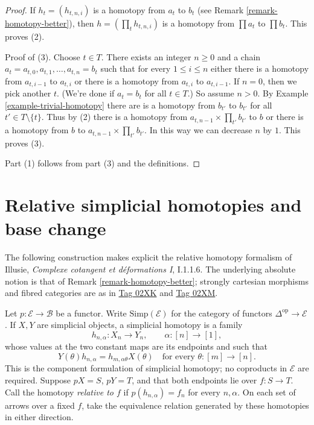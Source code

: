 \begin{proof}
If $h_t = (h_{t, n , i})$ is a homotopy from $a_t$ to $b_t$
(see Remark \ref{remark-homotopy-better}), then
$h = (\prod_t h_{t, n, i})$ is a homotopy from $\prod a_t$ to $\prod b_t$.
This proves (2).

\medskip\noindent
Proof of (3). Choose $t \in T$. There exists an integer $n \geq 0$
and a chain $a_t = a_{t, 0}, a_{t, 1}, \ldots, a_{t, n} = b_t$ such that
for every $1 \leq i \leq n$ either there is a homotopy from
$a_{t, i - 1}$ to $a_{t, i}$ or there is a homotopy from
$a_{t, i}$ to $a_{t, i - 1}$. If $n = 0$, then we pick another $t$.
(We're done if $a_t = b_t$ for all $t \in T$.) So assume $n > 0$.
By Example \ref{example-trivial-homotopy}
there are is a homotopy from $b_{t'}$ to $b_{t'}$ for all
$t' \in T \setminus \{t\}$. Thus by (2) there is a homotopy from
$a_{t, n - 1} \times \prod_{t'} b_{t'}$ to $b$ or there is a
homotopy from $b$ to $a_{t, n - 1} \times \prod_{t'} b_{t'}$.
In this way we can decrease $n$ by $1$. This proves (3).

\medskip\noindent
Part (1) follows from part (3) and the definitions.
\end{proof}





\section{Relative simplicial homotopies and base change}
\label{section-illusie-I-relative-homotopy}

\noindent
The following construction makes explicit the relative homotopy formalism
of Illusie, \textit{Complexe cotangent et d\'eformations I}, I.1.1.6.
The underlying absolute notion is that of
Remark \ref{remark-homotopy-better}; strongly cartesian morphisms and fibred
categories are as in
\href{https://stacks.math.columbia.edu/tag/02XK}{Tag 02XK} and
\href{https://stacks.math.columbia.edu/tag/02XM}{Tag 02XM}.

Let $p:\mathcal E\to\mathcal B$ be a functor. Write
$\mathrm{Simp}(\mathcal E)$ for the category of functors
$\Delta^{\mathrm{op}}\to\mathcal E$. If $X,Y$ are simplicial objects,
a simplicial homotopy is a family
$$
h_{n,\alpha}:X_n\longrightarrow Y_n,
\qquad \alpha:[n]\longrightarrow[1],
$$
whose values at the two constant maps are its endpoints and such that
$$
Y(\theta)h_{n,\alpha}
=h_{m,\alpha\theta}X(\theta)
\quad\text{for every }\theta:[m]\longrightarrow[n].
$$
This is the component formulation of simplicial homotopy; no coproducts
in $\mathcal E$ are required. Suppose $pX=S$, $pY=T$, and that both endpoints
lie over $f:S\to T$. Call the homotopy \emph{relative to $f$} if
$p(h_{n,\alpha})=f_n$ for every $n,\alpha$.
On each set of arrows over a fixed $f$, take the equivalence relation
generated by these homotopies in either direction.

